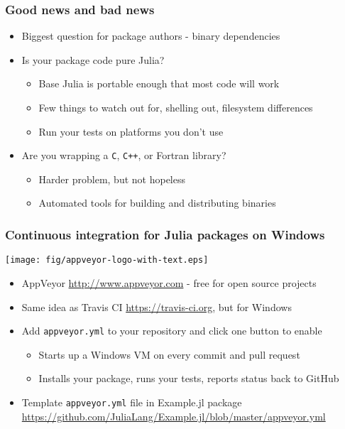 \documentclass[compressed,dvips,letter]{beamer}
\begin{document}
\begin{frame}[fragile]\frametitle{Good news and bad news}
\begin{itemize}
  \item Biggest question for package authors - binary dependencies
  \item Is your package code pure Julia?
  \begin{itemize}
    \item Base Julia is portable enough that most code will work
    \item Few things to watch out for, shelling out, filesystem differences
    \item Run your tests on platforms you don't use
  \end{itemize}
  \item Are you wrapping a \texttt{C}, \texttt{C++}, or Fortran library?
  \begin{itemize}
    \item Harder problem, but not hopeless
    \item Automated tools for building and distributing binaries
  \end{itemize}
\end{itemize}

\end{frame}
%
%



\begin{frame}[fragile]\frametitle{Continuous integration for Julia packages on Windows}
\begin{center}
\texttt{[image: fig/appveyor-logo-with-text.eps]}
\end{center}
\begin{itemize}
  \item AppVeyor {\small \url{http://www.appveyor.com}} - free for open source projects
  \item Same idea as Travis CI {\small \url{https://travis-ci.org}}, but for Windows
  \item Add \texttt{appveyor.yml} to your repository and click one button to enable
  \begin{itemize}
    \item Starts up a Windows VM on every commit and pull request
    \item Installs your package, runs your tests, reports status back to GitHub
  \end{itemize}
  \item Template \texttt{appveyor.yml} file in Example.jl package \\ \url{https://github.com/JuliaLang/Example.jl/blob/master/appveyor.yml}
\end{itemize}

\end{frame}
%
%
\end{document}
